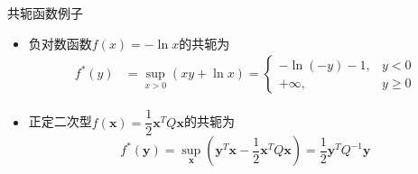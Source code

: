 \begin{frame}

\begin{block}{共轭函数例子}
\begin{itemize}
\item 负对数函数$f(x) = -\ln x$的共轭为
\begin{align*}
f^*(y) & = \sup\limits_{x>0} \left( xy + \ln x \right) = \begin{cases}
-\ln(-y) - 1, & y < 0 \\
+\infty, & y \ge 0
\end{cases}
\end{align*}
\item 正定二次型$f(\mathbf{x}) = \dfrac{1}{2} \mathbf{x}^T Q \mathbf{x}$的共轭为
\[f^*(\mathbf{y}) = \sup\limits_{\mathbf{x}} \left( \mathbf{y}^T\mathbf{x} - \dfrac{1}{2} \mathbf{x}^T Q \mathbf{x} \right) = \dfrac{1}{2} \mathbf{y}^T Q^{-1} \mathbf{y}\]
\end{itemize}
\end{block}

\end{frame}








